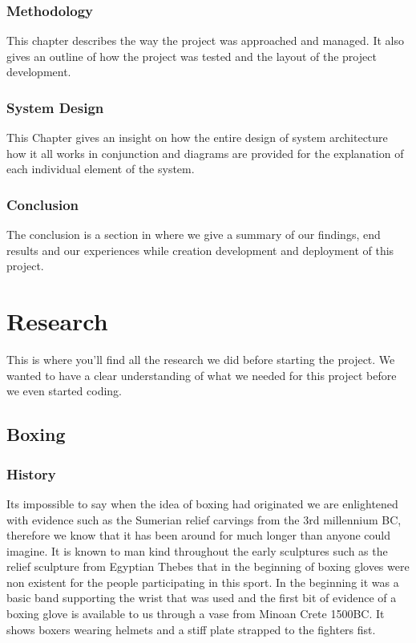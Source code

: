 \documentclass[a4paper,12pt,twoside]{report}
\begin{document}
\subsection{Methodology}
This chapter describes the way the project was approached and managed. It also gives an outline of how the project was tested and the layout of the project development.
\subsection{System Design}
This Chapter gives an insight on how the entire design of system architecture how it all works in conjunction and diagrams are provided for the explanation of each individual element of the system. 
\subsection{Conclusion}
The conclusion is a section in where we give a summary of our findings, end results and our experiences while creation development and deployment of this project.


\chapter{Research}
This is where you'll find all the research we did before starting the project. We wanted to have a clear understanding of what we needed for this project before we even started coding. 
\section{Boxing}
\subsection{History}
Its impossible to say when the idea of boxing had originated we are enlightened with evidence such as the Sumerian relief carvings from the 3rd millennium BC, therefore we know that it has been around for much longer than anyone could imagine.\newline
It is known to man kind throughout the early sculptures such as the relief sculpture from Egyptian Thebes that in the beginning of boxing gloves were non existent for the people participating in this sport.\newline
In the beginning it was a basic band supporting the wrist that was used and the first bit of evidence of a boxing glove is available to us through a vase from Minoan Crete 1500BC. It shows boxers wearing helmets and a stiff plate strapped to the fighters fist.
\cite{Boxing}
\end{document}

